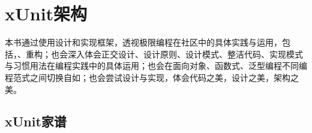 \begin{savequote}[45mm]
\end{savequote}

\chapter{xUnit架构} 
\label{ch:xunit-architecture}

\begin{content}

本书通过使用\cpp{}设计和实现框架，透视极限编程在\cpp{}社区中的具体实践与运用，包括，、重构；也会深入体会正交设计、设计原则、设计模式、整洁代码、实现模式与习惯用法在编程实践中的具体运用；也会在面向对象、函数式、泛型编程不同编程范式之间切换自如；也会尝试设计与实现，体会代码之美，设计之美，架构之美。

\end{content}

\section{xUnit家谱}

